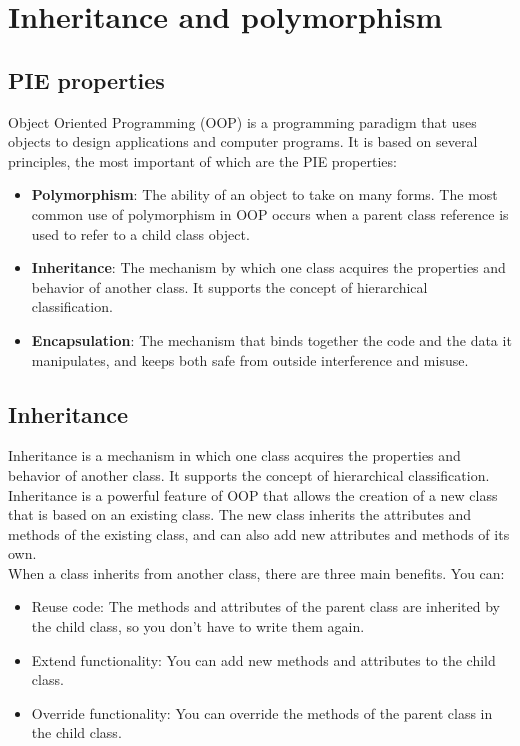 \chapter{Inheritance and polymorphism}

\section{PIE properties}

Object Oriented Programming (OOP) is a programming paradigm that uses objects to design 
applications and computer programs. It is based on several principles, the most important 
of which are the PIE properties:

\begin{itemize}
    \item \textbf{Polymorphism}: The ability of an object to take on many forms. The most 
    common use of polymorphism in OOP occurs when a parent class reference is used to refer 
    to a child class object.
    \item \textbf{Inheritance}: The mechanism by which one class acquires the properties and 
    behavior of another class. It supports the concept of hierarchical classification.
    \item \textbf{Encapsulation}: The mechanism that binds together the code and the data it 
    manipulates, and keeps both safe from outside interference and misuse.
\end{itemize}

\section{Inheritance}

Inheritance is a mechanism in which one class acquires the properties and behavior of 
another class. It supports the concept of hierarchical classification. Inheritance is 
a powerful feature of OOP that allows the creation of a new class that is based on an
existing class. The new class inherits the attributes and methods of the existing class,
and can also add new attributes and methods of its own.\\

When a class inherits from another class, there are three main benefits. You can:

\begin{itemize}
    \item Reuse code: The methods and attributes of the parent class are inherited by the 
    child class, so you don't have to write them again.
    \item Extend functionality: You can add new methods and attributes to the child class.
    \item Override functionality: You can override the methods of the parent class in the 
    child class.
\end{itemize}

